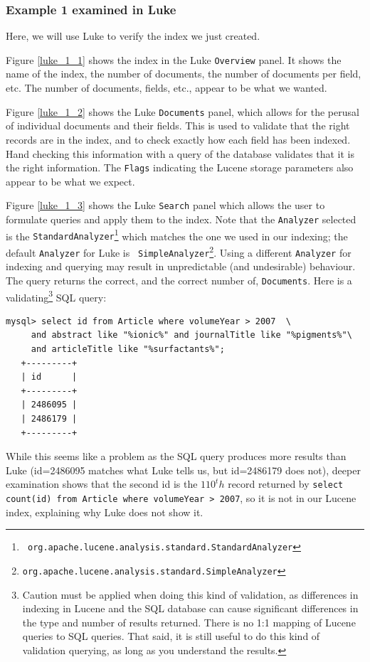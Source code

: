 \subsubsection{Example 1 examined in Luke}
Here, we will use Luke to verify the index we just created.
\begin{mlist}

\item Figure \ref{luke_1_1} shows the index in the Luke {\tt Overview} panel.
  It shows the name of the index, the number of documents, the number of
  documents per field, etc.
  The number of documents, fields, etc., appear to be what we wanted.

\item Figure \ref{luke_1_2} shows the Luke {\tt Documents} panel, which allows for
  the perusal of individual documents and their fields.
  This is used to validate that the right records are in the index, and to check
  exactly how each field has been indexed.
  Hand checking this information with a query of the database validates
  that it is the right information.
  The {\tt Flags} indicating the Lucene storage parameters also appear to be
  what we expect. 

\item Figure \ref{luke_1_3} shows the Luke {\tt Search} panel which allows the user to
  formulate queries and apply them to the index.
  Note that the {\tt Analyzer} selected is the {\tt StandardAnalyzer}\footnote{\tt
    org.apache.lucene.analysis.standard.StandardAnalyzer} which matches the
  one we used in our indexing; the default
  {\tt Analyzer} for Luke is {\tt
    SimpleAnalyzer}\footnote{{\tt org.apache.lucene.analysis.standard.SimpleAnalyzer}}. 
  Using a different {\tt Analyzer} for indexing and querying may result in
  unpredictable (and undesirable) behaviour.
  The query returns the correct, and the correct number of, {\tt Documents}.
  Here is a validating\footnote{
    Caution must be applied when doing this kind of validation, as 
    differences in indexing in Lucene and the SQL database can cause
    significant differences in the type and number of results returned. 
    There is no 1:1 mapping of Lucene queries to SQL queries.
    That said, it is still useful to do this kind of validation querying,
    as long as you understand the results.}
  SQL query:\\
{\small 
\begin{lstlisting}[backgroundcolor=\color{grey}]
  mysql> select id from Article where volumeYear > 2007  \
     and abstract like "%ionic%" and journalTitle like "%pigments%"\
     and articleTitle like "%surfactants%";
   +---------+
   | id      |
   +---------+
   | 2486095 | 
   | 2486179 | 
   +---------+
\end{lstlisting}
}
    While this seems like a problem as the SQL query produces more results
    than Luke (id=2486095 matches what Luke tells us, but id=2486179 does
    not), deeper examination shows that the second id is the $110^th$ record
    returned by {\tt select count(id)  from Article where volumeYear > 2007},
    so it is not in our Lucene index, explaining why Luke does not show it.
\end{mlist}


